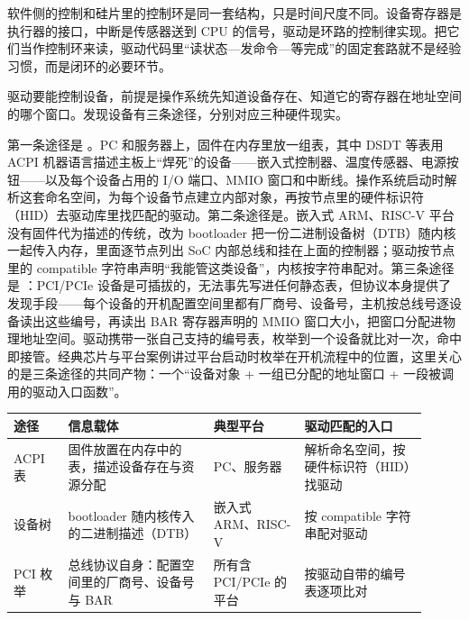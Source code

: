 \begin{keyidea}
软件侧的控制和硅片里的控制环是同一套结构，只是时间尺度不同。设备寄存器是执行器的接口，中断是传感器送到 CPU 的信号，驱动是环路的控制律实现。把它们当作控制环来读，驱动代码里“读状态—发命令—等完成”的固定套路就不是经验习惯，而是闭环的必要环节。
\end{keyidea}


驱动要能控制设备，前提是操作系统先知道设备存在、知道它的寄存器在地址空间的哪个窗口。发现设备有三条途径，分别对应三种硬件现实。

第一条途径是 。PC 和服务器上，固件在内存里放一组表，其中 DSDT 等表用 ACPI 机器语言描述主板上“焊死”的设备——嵌入式控制器、温度传感器、电源按钮——以及每个设备占用的 I/O 端口、MMIO 窗口和中断线。操作系统启动时解析这套命名空间，为每个设备节点建立内部对象，再按节点里的硬件标识符（HID）去驱动库里找匹配的驱动。第二条途径是。嵌入式 ARM、RISC-V 平台没有固件代为描述的传统，改为 bootloader 把一份二进制设备树（DTB）随内核一起传入内存，里面逐节点列出 SoC 内部总线和挂在上面的控制器；驱动按节点里的 compatible 字符串声明“我能管这类设备”，内核按字符串配对。第三条途径是 ：PCI/PCIe 设备是可插拔的，无法事先写进任何静态表，但协议本身提供了发现手段——每个设备的开机配置空间里都有厂商号、设备号，主机按总线号逐设备读出这些编号，再读出 BAR 寄存器声明的 MMIO 窗口大小，把窗口分配进物理地址空间。驱动携带一张自己支持的编号表，枚举到一个设备就比对一次，命中即接管。经典芯片与平台案例讲过平台启动时枚举在开机流程中的位置，这里关心的是三条途径的共同产物：一个“设备对象 + 一组已分配的地址窗口 + 一段被调用的驱动入口函数”。

\begin{longtable}{L{0.12\linewidth}L{0.32\linewidth}L{0.20\linewidth}L{0.27\linewidth}}
\toprule
途径 & 信息载体 & 典型平台 & 驱动匹配的入口 \\
\midrule
ACPI 表 & 固件放置在内存中的表，描述设备存在与资源分配 & PC、服务器 & 解析命名空间，按硬件标识符（HID）找驱动 \\\tablerowrule
设备树 & bootloader 随内核传入的二进制描述（DTB） & 嵌入式 ARM、RISC-V & 按 compatible 字符串配对驱动 \\\tablerowrule
PCI 枚举 & 总线协议自身：配置空间里的厂商号、设备号与 BAR & 所有含 PCI/PCIe 的平台 & 按驱动自带的编号表逐项比对 \\
\bottomrule
\end{longtable}

